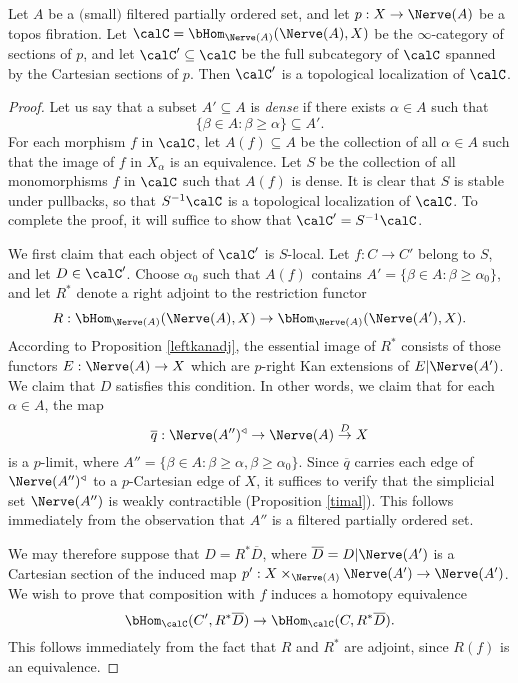 \begin{proposition}\label{steak1}
Let $A$ be a $($small$)$ filtered partially ordered set, and let $p: X \rightarrow \Nerve(A)$
be a topos fibration. Let $\calC = \bHom_{ \Nerve(A) }( \Nerve(A), X)$ be the $\infty$-category of sections of $p$, and let $\calC' \subseteq \calC$ be the full subcategory of $\calC$
spanned by the Cartesian sections of $p$. Then $\calC'$ is a topological localization of $\calC$.
\end{proposition}

\begin{proof}
Let us say that a subset $A' \subseteq A$ is {\it dense} if there exists $\alpha \in A$ such that
$$ \{ \beta \in A: \beta \geq \alpha \} \subseteq A'.$$
For each morphism $f$ in $\calC$, let $A(f) \subseteq A$ be the collection of all
$\alpha \in A$ such that the image of $f$ in $X_{\alpha}$ is an equivalence. Let
$S$ be the collection of all monomorphisms $f$ in $\calC$ such that $A(f)$ is dense.
It is clear that $S$ is stable under pullbacks, so that $S^{-1} \calC$ is a topological localization of $\calC$. To complete the proof, it will suffice to show that $\calC' = S^{-1} \calC$.

We first claim that each object of $\calC'$ is $S$-local. Let $f: C \rightarrow C'$
belong to $S$, and let $D \in \calC'$. Choose $\alpha_0$ such that $A(f)$ contains
$A' = \{ \beta \in A: \beta \geq \alpha_0 \}$, and let $R^{\ast}$ denote a right adjoint to
the restriction functor 
$$ R: \bHom_{ \Nerve(A)}( \Nerve(A), X) \rightarrow \bHom_{ \Nerve(A)}( \Nerve(A'), X).$$
According to Proposition \ref{leftkanadj}, the essential image of $R^{\ast}$ consists of those functors
$E: \Nerve(A) \rightarrow X$ which are $p$-right Kan extensions of $E | \Nerve(A')$. We claim that $D$ satisfies this condition. In other words, we claim that
for each $\alpha \in A$, the map
$$ \overline{q}: \Nerve(A'')^{\triangleleft}
\rightarrow \Nerve(A) \stackrel{D}{\rightarrow} X$$
is a $p$-limit, where $A'' = \{ \beta \in A: \beta \geq \alpha, \beta \geq \alpha_0 \}$. Since $\overline{q}$ carries each edge of
$\Nerve(A'')^{\triangleleft}$
to a $p$-Cartesian edge of $X$, it suffices to verify that the simplicial set
$\Nerve(A'')$ is weakly contractible (Proposition \ref{timal}). This follows immediately from the observation that $A''$ is a filtered partially ordered set.

We may therefore suppose that $D = R^{\ast} \overline{D}$, 
where $\overline{D} = D | \Nerve(A')$ is a Cartesian section of the induced
map $p': X \times_{ \Nerve(A)} \Nerve(A') \rightarrow \Nerve(A')$. 
We wish to prove that composition with $f$ induces a homotopy equivalence
$$ \bHom_{\calC}( C', R^{\ast} \overline{D}) \rightarrow \bHom_{\calC}(C, R^{\ast} \overline{D}).$$
This follows immediately from the fact that $R$ and $R^{\ast}$ are adjoint, since $R(f)$ is an equivalence.


\end{proof}
